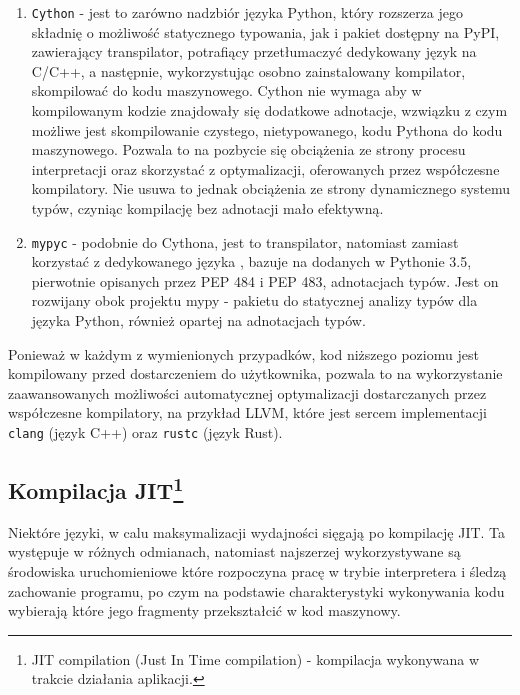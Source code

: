 \documentclass[12pt, a4paper]{article}
\newcommand{\code}[1]{\texttt{#1}}
\begin{document}
\begin{sloppypar}
\begin{enumerate}
      \item \code{Cython}\cite{Cython_Org}\cite{Cython_The_Best_Of_Both} - jest to
        zarówno nadzbiór języka Python, który rozszerza jego składnię o możliwość statycznego
        typowania, jak i pakiet dostępny na PyPI, zawierający transpilator, potrafiący
        przetłumaczyć dedykowany język na C/C++, a następnie, wykorzystując osobno
        zainstalowany kompilator, skompilować do kodu maszynowego. Cython nie wymaga aby
        w kompilowanym kodzie znajdowały się dodatkowe adnotacje, wzwiązku z czym możliwe
        jest skompilowanie czystego, nietypowanego, kodu Pythona do kodu maszynowego.
        Pozwala to na pozbycie się obciążenia ze strony procesu interpretacji oraz
        skorzystać z optymalizacji, oferowanych przez współczesne kompilatory. Nie usuwa
        to jednak obciążenia ze strony dynamicznego systemu typów, czyniąc kompilację bez
        adnotacji mało efektywną.

      \item \code{mypyc}\cite{mypyc} - podobnie do Cythona, jest to transpilator, natomiast
        zamiast korzystać z dedykowanego języka , bazuje na dodanych w Pythonie 3.5\cite{Python_3_5},
        pierwotnie opisanych przez PEP 484\cite{PEP_484} i PEP 483\cite{PEP_483},
        adnotacjach typów. Jest on rozwijany obok projektu mypy - pakietu do statycznej analizy
        typów dla języka Python, również opartej na adnotacjach typów\cite{mypy}.
    \end{enumerate}

    Ponieważ w każdym z wymienionych przypadków, kod niższego poziomu jest kompilowany
    przed dostarczeniem do użytkownika, pozwala to na wykorzystanie zaawansowanych możliwości
    automatycznej optymalizacji dostarczanych przez współczesne kompilatory, na przykład
    LLVM, które jest sercem implementacji \code{clang} (język C++) oraz \code{rustc} (język
    Rust).

    \subsection{Kompilacja JIT\protect\footnote{JIT compilation (Just In Time compilation) - kompilacja wykonywana w trakcie działania aplikacji.}}


    Niektóre języki, w calu maksymalizacji wydajności sięgają po kompilację JIT. Ta występuje
    w różnych odmianach, natomiast najszerzej wykorzystywane są środowiska
    uruchomieniowe które rozpoczyna pracę w trybie interpretera i śledzą zachowanie
    programu, po czym na podstawie charakterystyki wykonywania kodu wybierają które jego
    fragmenty przekształcić w kod maszynowy.


\end{sloppypar}
\end{document}
